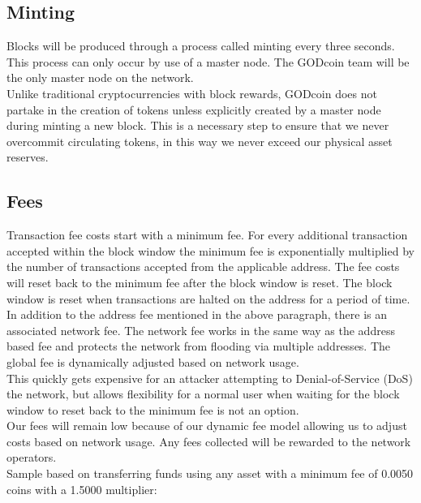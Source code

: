 \documentclass[12pt,a4paper]{article}
\begin{document}
  \subsection{Minting}
  Blocks will be produced through a process called minting every three seconds.
  This process can only occur by use of a master node. The GODcoin team will be
  the only master node on the network.\\

  Unlike traditional cryptocurrencies with block rewards, GODcoin does not
  partake in the creation of tokens unless explicitly created by a master node
  during minting a new block. This is a necessary step to ensure that we never
  overcommit circulating tokens, in this way we never exceed our physical asset
  reserves.

  \subsection{Fees}
  Transaction fee costs start with a minimum fee. For every additional
  transaction accepted within the block window the minimum fee is exponentially
  multiplied by the number of transactions accepted from the applicable address.
  The fee costs will reset back to the minimum fee after the block window is
  reset. The block window is reset when transactions are halted on the address
  for a period of time.\\

  In addition to the address fee mentioned in the above paragraph, there is an
  associated  network fee. The network fee works in the same way as
  the address based fee and protects the network from flooding via multiple
  addresses. The global fee is dynamically adjusted based on network usage.\\

  This quickly gets expensive for an attacker attempting to Denial-of-Service
  (DoS) the network, but allows flexibility for a normal user when waiting for
  the block window to reset back to the minimum fee is not an option.\\

  Our fees will remain low because of our dynamic fee model allowing us to
  adjust costs based on network usage. Any fees collected will be rewarded to
  the network operators.\\

  Sample based on transferring funds using any asset with a minimum fee of
  0.0050 coins with a 1.5000 multiplier:
\end{document}
